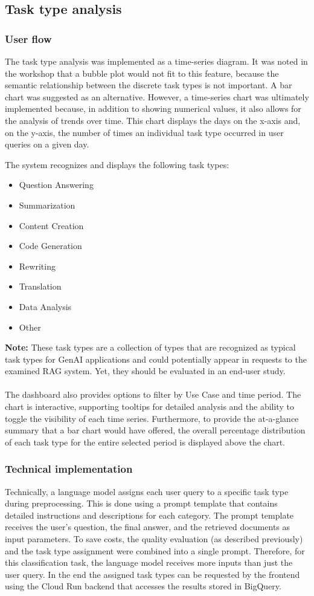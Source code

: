 \documentclass[
	english,
	ruledheaders=section,%
	class=report,%
	thesis={type=bachelor},%
	accentcolor=1b,%
	custommargins=true,%
	marginpar=false,%
	parskip=half-,%
	fontsize=11pt,%
	DIV=14,
]{tudapub}
\begin{document}
\subsection{Task type analysis}
\subsubsection{User flow}
The task type analysis was implemented as a time-series diagram. It was noted in the workshop that a bubble plot would not fit to this feature, because the semantic relationship between the discrete task types is not important. A bar chart was suggested as an alternative. However, a time-series chart was ultimately implemented because, in addition to showing numerical values, it also allows for the analysis of trends over time. This chart displays the days on the x-axis and, on the y-axis, the number of times an individual task type occurred in user queries on a given day.

The system recognizes and displays the following task types:
\begin{itemize}
    \item Question Answering
    \item Summarization
    \item Content Creation
    \item Code Generation
    \item Rewriting
    \item Translation
    \item Data Analysis
    \item Other
\end{itemize}
\textbf{Note:} These task types are a collection of types that are recognized as typical task types for GenAI applications and could potentially appear in requests to the examined RAG system. Yet, they should be evaluated in an end-user study.\\
\\
The dashboard also provides options to filter by Use Case and time period. The chart is interactive, supporting tooltips for detailed analysis and the ability to toggle the visibility of each time series. Furthermore, to provide the at-a-glance summary that a bar chart would have offered, the overall percentage distribution of each task type for the entire selected period is displayed above the chart.

\subsubsection{Technical implementation}
Technically, a language model assigns each user query to a specific task type during preprocessing. This is done using a prompt template that contains detailed instructions and descriptions for each category. The prompt template receives the user's question, the final answer, and the retrieved documents as input parameters. To save costs, the quality evaluation (as described previously) and the task type assignment were combined into a single prompt. Therefore, for this classification task, the language model receives more inputs than just the user query. In the end the assigned task types can be requested by the frontend using the Cloud Run backend that accesses the results stored in BigQuery.
\end{document}
